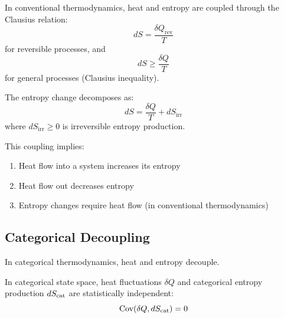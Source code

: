 In conventional thermodynamics, heat and entropy are coupled through the Clausius relation:
\begin{equation}
dS = \frac{\delta Q_{\text{rev}}}{T}
\label{eq:clausius}
\end{equation}
for reversible processes, and
\begin{equation}
dS \geq \frac{\delta Q}{T}
\label{eq:clausius_inequality}
\end{equation}
for general processes (Clausius inequality).

The entropy change decomposes as:
\begin{equation}
dS = \frac{\delta Q}{T} + dS_{\text{irr}}
\label{eq:entropy_decomposition}
\end{equation}
where $dS_{\text{irr}} \geq 0$ is irreversible entropy production.

This coupling implies:
\begin{enumerate}
    \item Heat flow into a system increases its entropy
    \item Heat flow out decreases entropy
    \item Entropy changes require heat flow (in conventional thermodynamics)
\end{enumerate}

\subsection{Categorical Decoupling}

In categorical thermodynamics, heat and entropy decouple.

\begin{theorem}
\label{thm:decoupling}
In categorical state space, heat fluctuations $\delta Q$ and categorical entropy production $dS_{\mathrm{cat}}$ are statistically independent:
\begin{equation}
\text{Cov}(\delta Q, dS_{\mathrm{cat}}) = 0
\label{eq:covariance_zero}
\end{equation}
\end{theorem}

